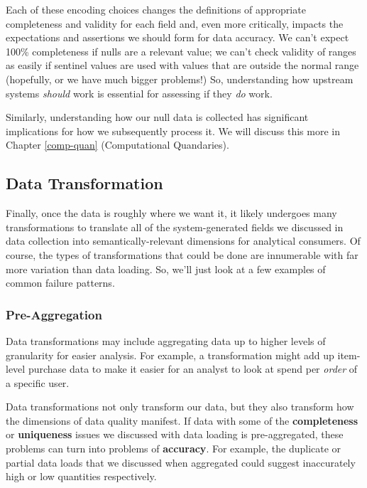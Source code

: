 \documentclass[
]{krantz}
\begin{document}
Each of these encoding choices changes the definitions of appropriate completeness and validity for each field and, even more critically, impacts the expectations and assertions we should form for data accuracy.
We can't expect 100\% completeness if nulls are a relevant value; we can't check validity of ranges as easily if sentinel values are used with values that are outside the normal range (hopefully, or we have much bigger problems!)
So, understanding how upstream systems \emph{should} work is essential for assessing if they \emph{do} work.

Similarly, understanding how our null data is collected has significant implications for how we subsequently process it. We will discuss this more in Chapter \ref{comp-quan} (Computational Quandaries).

\hypertarget{data-transformation}{%
\subsection{Data Transformation}\label{data-transformation}}

Finally, once the data is roughly where we want it, it likely undergoes many transformations to translate all of the system-generated fields we discussed in data collection into semantically-relevant dimensions for analytical consumers. Of course, the types of transformations that could be done are innumerable with far more variation than data loading. So, we'll just look at a few examples of common failure patterns.

\hypertarget{pre-aggregation}{%
\subsubsection{Pre-Aggregation}\label{pre-aggregation}}

Data transformations may include aggregating data up to higher levels of granularity for easier analysis. For example, a transformation might add up item-level purchase data to make it easier for an analyst to look at spend per \emph{order} of a specific user.

Data transformations not only transform our data, but they also transform how the dimensions of data quality manifest. If data with some of the \textbf{completeness} or \textbf{uniqueness} issues we discussed with data loading is pre-aggregated, these problems can turn into problems of \textbf{accuracy}. For example, the duplicate or partial data loads that we discussed when aggregated could suggest inaccurately high or low quantities respectively.
\end{document}

